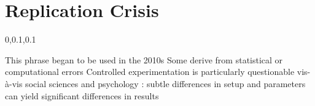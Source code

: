 
\section{Replication Crisis}\fbeg{}\begin{frame}{}


\vspace{-.5em}	

{\Large{}\selectfont

\hspace*{20pt}\begin{minipage}{.96\textwidth}
\vspace{4pt}
		
\begin{lightquadblockc}{0,0.1,0.1}{\parbox{21cm}{\centering \vspace{3pt}}}
\begin{center}\begin{minipage}{\textwidth}
{\Huge \setlength{\leftmargini}{30pt}\begin{enumerate}
\dmitem {\dsp} This phrase began to be used in the 2010s 
\vspace{20pt}
\dmitem {\dsp} Some  derive from statistical or computational errors
\vspace{20pt}
\dmitem {\dsp} Controlled experimentation is particularly questionable vis-\`a-vis social sciences and psychology
\vspace{20pt}
\dmitem {\dsp} : subtle differences in setup and parameters can yield significant differences in results
\vspace{20pt}
\end{enumerate}
}\end{minipage}
\end{center}
\end{lightquadblockc}
\end{minipage}

}

\end{frame}


